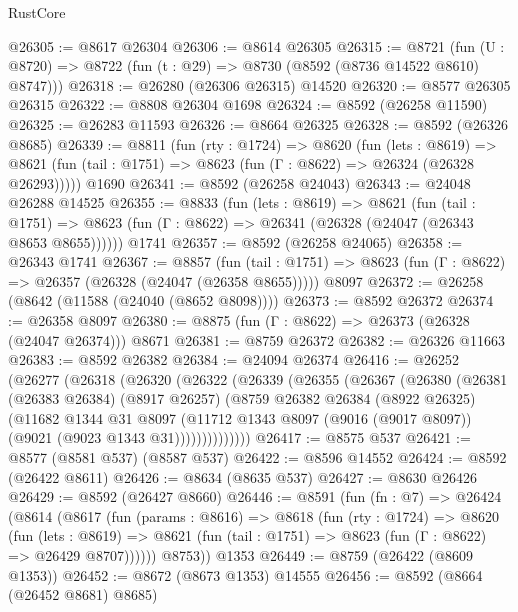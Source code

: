 \begin{lexlean}{RustCore}
\begin{coremodule}
@26305 := @8617 @26304
@26306 := @8614 @26305
@26315 := @8721
    (fun (U : @8720) => @8722 (fun (t : @29) => @8730 (@8592 (@8736 @14522 @8610) @8747)))
@26318 := @26280 (@26306 @26315) @14520
@26320 := @8577 @26305 @26315
@26322 := @8808 @26304 @1698
@26324 := @8592 (@26258 @11590)
@26325 := @26283 @11593
@26326 := @8664 @26325
@26328 := @8592 (@26326 @8685)
@26339 := @8811
    (fun (rty : @1724) =>
    @8620
      (fun (lets : @8619) =>
      @8621 (fun (tail : @1751) => @8623 (fun (Γ : @8622) => @26324 (@26328 @26293)))))
    @1690
@26341 := @8592 (@26258 @24043)
@26343 := @24048 @26288 @14525
@26355 := @8833
    (fun (lets : @8619) =>
    @8621
      (fun (tail : @1751) =>
      @8623 (fun (Γ : @8622) => @26341 (@26328 (@24047 (@26343 @8653 @8655))))))
    @1741
@26357 := @8592 (@26258 @24065)
@26358 := @26343 @1741
@26367 := @8857
    (fun (tail : @1751) => @8623 (fun (Γ : @8622) => @26357 (@26328 (@24047 (@26358 @8655)))))
    @8097
@26372 := @26258 (@8642 (@11588 (@24040 (@8652 @8098))))
@26373 := @8592 @26372
@26374 := @26358 @8097
@26380 := @8875 (fun (Γ : @8622) => @26373 (@26328 (@24047 @26374))) @8671
@26381 := @8759 @26372
@26382 := @26326 @11663
@26383 := @8592 @26382
@26384 := @24094 @26374
@26416 := @26252
    (@26277
      (@26318
        (@26320
          (@26322
            (@26339
              (@26355
                (@26367
                  (@26380
                    (@26381
                      (@26383 @26384)
                      (@8917 @26257)
                      (@8759
                        @26382
                        @26384
                        (@8922 @26325)
                        (@11682
                          @1344
                          @31
                          @8097
                          (@11712
                            @1343
                            @8097
                            (@9016 (@9017 @8097))
                            (@9021 (@9023 @1343 @31))))))))))))))
@26417 := @8575 @537
@26421 := @8577 (@8581 @537) (@8587 @537)
@26422 := @8596 @14552
@26424 := @8592 (@26422 @8611)
@26426 := @8634 (@8635 @537)
@26427 := @8630 @26426
@26429 := @8592 (@26427 @8660)
@26446 := @8591
    (fun (fn : @7) =>
    @26424
      (@8614
        (@8617
          (fun (params : @8616) =>
          @8618
            (fun (rty : @1724) =>
            @8620
              (fun (lets : @8619) =>
              @8621 (fun (tail : @1751) => @8623 (fun (Γ : @8622) => @26429 @8707))))))
        @8753))
    @1353
@26449 := @8759 (@26422 (@8609 @1353))
@26452 := @8672 (@8673 @1353) @14555
@26456 := @8592 (@8664 (@26452 @8681) @8685)

\end{coremodule}
\end{lexlean}
